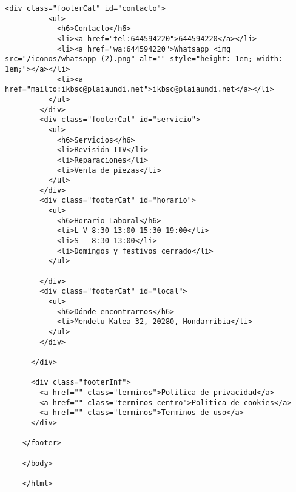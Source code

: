 \begin{lstlisting}[caption=index.html (LMSI)]
        <div class="footerCat" id="contacto">
          <ul>
            <h6>Contacto</h6>
            <li><a href="tel:644594220">644594220</a></li>
            <li><a href="wa:644594220">Whatsapp <img src="/iconos/whatsapp (2).png" alt="" style="height: 1em; width: 1em;"></a></li>
            <li><a href="mailto:ikbsc@plaiaundi.net">ikbsc@plaiaundi.net</a></li>
          </ul>
        </div>
        <div class="footerCat" id="servicio">
          <ul>
            <h6>Servicios</h6>
            <li>Revisión ITV</li>
            <li>Reparaciones</li>
            <li>Venta de piezas</li>
          </ul>
        </div>
        <div class="footerCat" id="horario">
          <ul>
            <h6>Horario Laboral</h6>
            <li>L-V 8:30-13:00 15:30-19:00</li>
            <li>S - 8:30-13:00</li>
            <li>Domingos y festivos cerrado</li>
          </ul>
    
        </div>
        <div class="footerCat" id="local">
          <ul>
            <h6>Dónde encontrarnos</h6>
            <li>Mendelu Kalea 32, 20280, Hondarribia</li>
          </ul>
        </div>
    
      </div>
    
      <div class="footerInf">
        <a href="" class="terminos">Politica de privacidad</a>
        <a href="" class="terminos centro">Politica de cookies</a>
        <a href="" class="terminos">Terminos de uso</a>
      </div>
    
    </footer>
    
    </body>
    
    </html>
\end{lstlisting}
\clearpage
